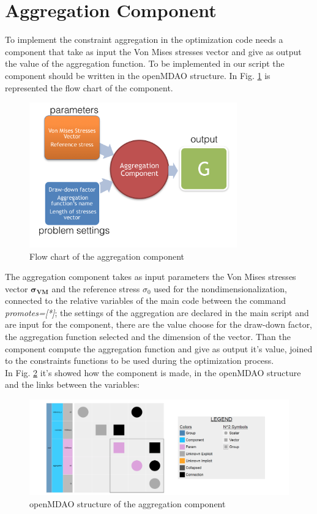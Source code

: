 \section{Aggregation Component}
To implement the constraint aggregation in the optimization code needs a component that take as input the Von Mises stresses vector and give as output the value of the aggregation function. To be implemented in our script the component should be written in the openMDAO structure. In Fig. \ref{fig:3_6} is represented the flow chart of the component.
\begin{figure}[H]
	\centering
	\includegraphics[width = 0.8\textwidth]{./Immagini/3_6.png}
	\caption{Flow chart of the aggregation component}
	\label{fig:3_6}
\end{figure}
The aggregation component takes as input parameters the Von Mises stresses vector $\mathbf{\sigma_{VM}}$ and the reference stress $\sigma_0$ used for the nondimensionalization, connected to the relative variables of the main code between the command \textit{promotes=[*]}; the settings of the aggregation are declared in the main script and are input for the component, there are the value choose for the draw-down factor, the aggregation function selected and the dimension of the vector. Than the component compute the aggregation function and give as output it's value, joined to the constraints functions to be used during the optimization process.\\
In Fig. \ref{fig:3_7} it's showed how the component is made, in the openMDAO structure and the links between the variables:
\begin{figure}[H]
	\centering
	\includegraphics[width = 1\textwidth]{./Immagini/3_7.png}
	\caption{openMDAO structure of the aggregation component}
	\label{fig:3_7}
\end{figure}
